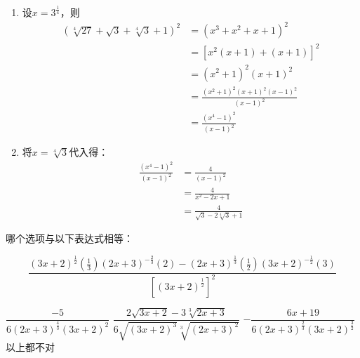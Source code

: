 \documentclass[answers]{exam}
\begin{document}
\begin{questions}
	\begin{solution}
		\begin{enumerate}
			\item 设$\displaystyle x=3^{\frac{1}{4}}$，则
			      \begin{align*}
				      (\sqrt[4]{27} + \sqrt{3} + \sqrt[4]{3} + 1)^2 & = (x^3 + x^2 + x + 1)^2                     \\
				                                                    & = [x^2(x+1) + (x+1)]^2                      \\
				                                                    & = (x^2 + 1)^2(x+1)^2                        \\
				                                                    & = \frac{(x^2 + 1)^2(x+1)^2(x-1)^2}{(x-1)^2} \\
				                                                    & = \frac{(x^4 - 1)^2}{(x-1)^2}
			      \end{align*}
			\item 将$x=\sqrt[4]{3}$代入得：
			      \begin{align*}
				      \frac{(x^4 - 1)^2}{(x-1)^2} & = \frac{4}{(x-1)^2}                     \\
				                                  & = \frac{4}{x^2 - 2x + 1}                \\
				                                  & = \frac{4}{\sqrt{3} - 2\sqrt[4]{3} + 1}
			      \end{align*}
		\end{enumerate}
	\end{solution}

	\question 哪个选项与以下表达式相等：

	\begin{equation*}
		\dfrac{(3x+2)^{\frac{1}{2}}\left(\frac{1}{3}\right)(2x+3)^{-\frac{2}{3}}(2) -
		(2x+3)^{\frac{1}{3}}\left(\frac{1}{2}\right)(3x+2)^{-\frac{1}{2}}(3)}{\left[(3x+2)^\frac{1}{2}\right]^2}
	\end{equation*}

	\begin{oneparchoices}
		\choice \(  \dfrac{-5}{6(2x+3)^{\frac{4}{3}}(3x+2)^2}\)
		\choice \( \dfrac{2\sqrt{3x+2} - 3\sqrt[3]{2x+3}}{6\sqrt{(3x+2)^3}\sqrt[3]{(2x+3)^2}} \)
		\CorrectChoice \( -\dfrac{6x+19}{6(2x+3)^{\frac{2}{3}}(3x+2)^{\frac{3}{2}}} \) \\
		\choice 以上都不对
	\end{oneparchoices}


\end{questions}
\end{document}

